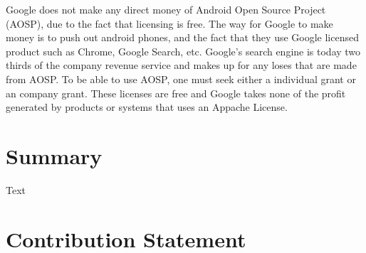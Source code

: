 \documentclass[conference]{IEEEtran}
\begin{document}
Google does not make any direct money of Android Open Source Project (AOSP), due to the fact that licensing is free.\cite{Money} The way for Google to make money is to push out android phones, and the fact that they use Google licensed product such as Chrome, Google Search, etc. Google's search engine is today two thirds of the company revenue service and makes up for any loses that are made from AOSP. To be able to use AOSP, one must seek either a individual grant or an company grant. \cite{android-licenses} These licenses are free and Google takes none of the profit generated by products or systems that uses an Appache License.
\section{Summary}

{Text}


\section{Contribution Statement}
\end{document}
